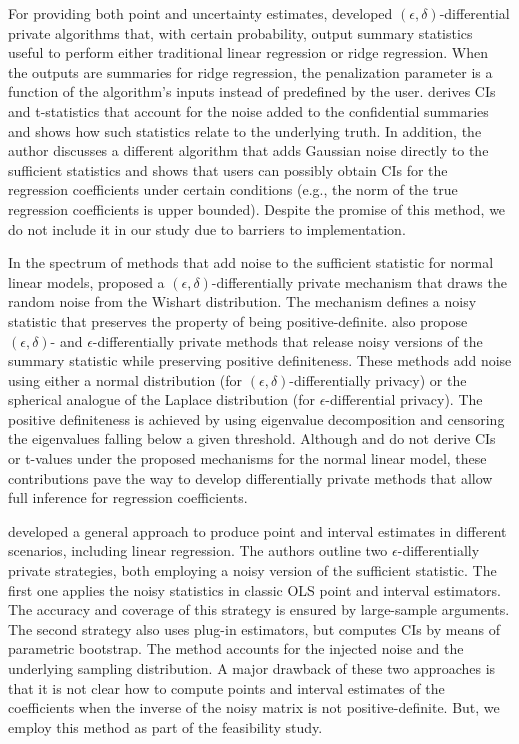For providing both point and uncertainty estimates, \citet{sheffet2017differentially} developed $(\epsilon,\delta)$-differential private algorithms that, with certain probability, output summary statistics useful to perform either traditional linear regression or ridge regression. When the outputs are summaries for ridge regression, the penalization parameter is a function of the algorithm's inputs instead of predefined by the user. \citet{sheffet2017differentially} derives CIs and t-statistics that account for the noise added to the confidential summaries and shows how such statistics relate to the underlying truth. In addition, the author discusses a different algorithm that adds Gaussian noise directly to the sufficient statistics and shows that users can possibly obtain CIs for the regression coefficients under certain conditions (e.g., the norm of the true regression coefficients is upper bounded). Despite the promise of this method, we do not include it in our study due to barriers to implementation.

In the spectrum of methods that add noise to the sufficient statistic for normal linear models, \citet{sheffet2019old} proposed a $(\epsilon,\delta)$-differentially private mechanism that draws the random noise from the Wishart distribution. The mechanism defines a noisy statistic that preserves the property of being positive-definite. \citet{wang2019differentially} also propose $(\epsilon,\delta)$- and $\epsilon$-differentially private methods that release noisy versions of the summary statistic while preserving positive definiteness. These methods add noise using either a normal distribution (for $(\epsilon,\delta)$-differentially privacy) or the spherical analogue of the Laplace distribution (for $\epsilon$-differential privacy). The positive definiteness is achieved by using eigenvalue decomposition and censoring the eigenvalues falling below a given threshold. Although \citet{sheffet2019old} and \citet{wang2019differentially} do not derive CIs or t-values under the proposed mechanisms for the normal linear model, these contributions pave the way to develop differentially private methods that allow full inference for regression coefficients.  

\citet{ferrando2020general} developed a general approach to produce point and interval estimates in different scenarios, including linear regression. The authors outline two $\epsilon$-differentially private strategies, both employing a noisy version of the sufficient statistic. The first one applies the noisy statistics in classic OLS point and interval estimators. The accuracy and coverage of this strategy is ensured by large-sample arguments. The second strategy also uses plug-in estimators, but computes CIs by means of parametric bootstrap. The method accounts for the injected noise and the underlying sampling distribution. A major drawback of these two approaches is that it is not clear how to compute points and interval estimates of the coefficients when the inverse of the noisy matrix is not positive-definite. But, we employ this method as part of the feasibility study.

